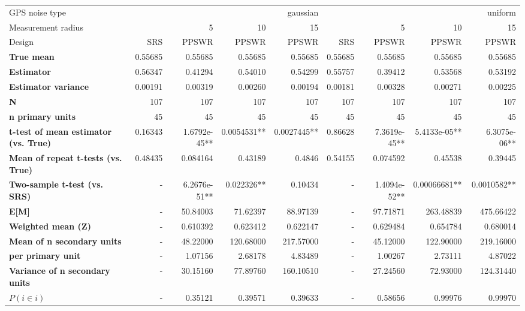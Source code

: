 \begin{tabular}{l|r|rrr|r|rrr}
\toprule
GPS noise type & \multicolumn{4}{r}{gaussian} & \multicolumn{4}{r}{uniform} \\
Measurement radius &  & 5 & 10 & 15 &  & 5 & 10 & 15 \\
Design & SRS & PPSWR & PPSWR & PPSWR & SRS & PPSWR & PPSWR & PPSWR \\
\midrule
\textbf{True mean} &  0.55685 &  0.55685 &  0.55685 &  0.55685 &  0.55685 &  0.55685 &  0.55685 &  0.55685 \\
\textbf{Estimator} & 0.56347 & 0.41294 & 0.54010 & 0.54299 & 0.55757 & 0.39412 & 0.53568 & 0.53192 \\
\textbf{Estimator variance} & 0.00191 & 0.00319 & 0.00260 & 0.00194 & 0.00181 & 0.00328 & 0.00271 & 0.00225 \\
\textbf{N} & 107 & 107 & 107 & 107 & 107 & 107 & 107 & 107 \\
\textbf{n primary units} & 45 & 45 & 45 & 45 & 45 & 45 & 45 & 45 \\
\textbf{t-test of mean estimator (vs. True)} & 0.16343 & 1.6792e-45** & 0.0054531** & 0.0027445** & 0.86628 & 7.3619e-45** & 5.4133e-05** & 6.3075e-06** \\
\textbf{Mean of repeat t-tests (vs. True)} & 0.48435 & 0.084164 & 0.43189 & 0.4846 & 0.54155 & 0.074592 & 0.45538 & 0.39445 \\
\textbf{Two-sample t-test (vs. SRS)} & - & 6.2676e-51** & 0.022326** & 0.10434 & - & 1.4094e-52** & 0.00066681** & 0.0010582** \\
\textbf{E[M]} & - & 50.84003 & 71.62397 & 88.97139 & - & 97.71871 & 263.48839 & 475.66422 \\
\textbf{Weighted mean (Z)} & - & 0.610392 & 0.623412 & 0.622147 & - & 0.629484 & 0.654784 & 0.680014 \\
\textbf{Mean of n secondary units} & - & 48.22000 & 120.68000 & 217.57000 & - & 45.12000 & 122.90000 & 219.16000 \\
\textbf{     per primary unit} & - & 1.07156 & 2.68178 & 4.83489 & - & 1.00267 & 2.73111 & 4.87022 \\
\textbf{Variance of n secondary units} & - & 30.15160 & 77.89760 & 160.10510 & - & 27.24560 & 72.93000 & 124.31440 \\
\textbf{$P(i \in i)$} & - & 0.35121 & 0.39571 & 0.39633 & - & 0.58656 & 0.99976 & 0.99970 \\
\bottomrule
\end{tabular}
